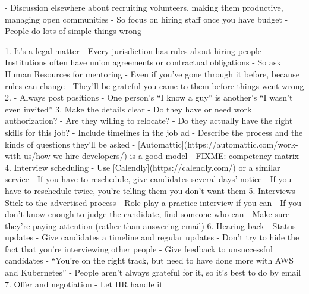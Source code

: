 \documentclass[10pt,letterpaper]{article}
\begin{document}
- Discussion elsewhere about recruiting volunteers, making them productive, managing open communities \cite{Sholler2019}
  - So focus on hiring staff once you have budget
- People do lots of simple things wrong \cite{Behroozi2020}

1. It's a legal matter
   - Every jurisdiction has rules about hiring people
   - Institutions often have union agreements or contractual obligations
   - So ask Human Resources for mentoring
     - Even if you've gone through it before, because rules can change
   - They'll be grateful you came to them before things went wrong
2. - Always post positions
   - One person's ``I know a guy'' is another's ``I wasn't even invited''
3. Make the details clear
   - Do they have or need work authorization?
   - Are they willing to relocate?
   - Do they actually have the right skills for this job?
   - Include timelines in the job ad
   - Describe the process and the kinds of questions they'll be asked
     - [Automattic](https://automattic.com/work-with-us/how-we-hire-developers/) is a good model
   - FIXME: competency matrix
4. Interview scheduling
   - Use [Calendly](https://calendly.com/) or a similar service
   - If you have to reschedule, give candidates several days' notice
     - If you have to reschedule twice, you're telling them you don't want them
5. Interviews
   - Stick to the advertised process
     - Role-play a practice interview if you can
   - If you don't know enough to judge the candidate, find someone who can
   - Make sure they're paying attention (rather than answering email)
6. Hearing back
   - Status updates
     - Give candidates a timeline and regular updates
     - Don't try to hide the fact that you're interviewing other people
   - Give feedback to unsuccessful candidates
     - ``You're on the right track, but need to have done more with AWS and Kubernetes''
     - People aren't always grateful for it, so it's best to do by email
7. Offer and negotiation
   - Let HR handle it
\end{document}
